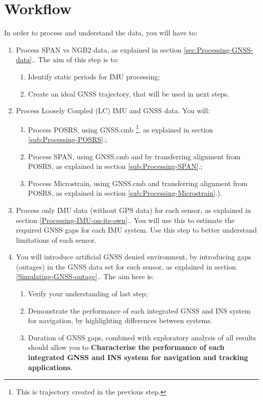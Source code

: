 \documentclass[11pt,fleqn]{book} %
\newcommand*{\refLoc}[1]{as explained in section \ref{#1}.\xspace}
\begin{document}
\section{Workflow}

In order to process and understand the data, you will have to:

\begin{enumerate}
	\item Process SPAN vs NGB2 data, \refLoc{sec:Processing-GNSS-data}. The aim of this step is to: 
	\begin{enumerate}
		\item Identify static periods for IMU processing;
		\item Create an ideal GNSS trajectory, that will be used in next steps.
	\end{enumerate}
	\item Process Loosely Coupled (LC) IMU and GNSS data. You will:
	\begin{enumerate}
		\item Process POSRS, using GNSS.cmb \footnote{This is trajectory created in the previous step.}, \refLoc{sub:Processing-POSRS};
		\item Process SPAN, using GNSS.cmb and by transferring alignment from POSRS, \refLoc{sub:Processing-SPAN};
		\item Process Microstrain, using GNSS.cmb and transferring alignment from POSRS, \refLoc{sub:Processing-Microstrain}).
	\end{enumerate}
	\item Process only IMU data (without GPS data) for each sensor, \refLoc{Processing-IMU-on-its-own}. You will use this to estimate the required GNSS gaps for each IMU system. Use this step to better understand limitations of each sensor. 
	\item You will introduce artificial GNSS denied environment, by introducing gaps (outages) in the GNSS data set for each sensor, \refLoc{Simulating-GNSS-outage}. The aim here is: 
	\begin{enumerate}
	\item Verify your understanding of last step;
	\item Demonstrate the performance of each integrated GNSS and INS system for navigation, by highlighting differences between systems.
	\item Duration of GNSS gaps, combined with exploratory analysis of all results should allow you to \textbf{Characterise the performance of each integrated GNSS and INS system for navigation and tracking applications}.

\end{enumerate}
\end{enumerate}
\end{document}
